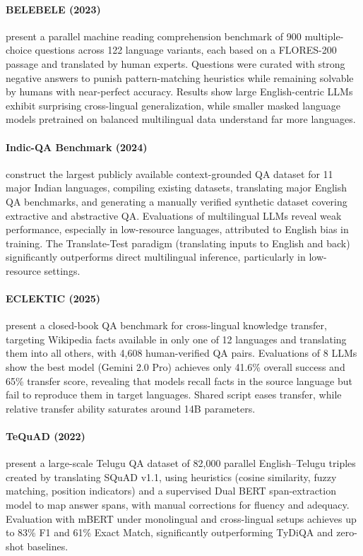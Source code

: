\documentclass[letterpaper]{article}
\begin{document}
\paragraph{BELEBELE (2023)} \citet{bandarkar2023belebele} present a parallel machine reading comprehension benchmark of 900 multiple-choice questions across 122 language variants, each based on a FLORES-200 passage and translated by human experts. Questions were curated with strong negative answers to punish pattern-matching heuristics while remaining solvable by humans with near-perfect accuracy. Results show large English-centric LLMs exhibit surprising cross-lingual generalization, while smaller masked language models pretrained on balanced multilingual data understand far more languages.

\paragraph{Indic-QA Benchmark (2024)} \citet{singh2024indic} construct the largest publicly available context-grounded QA dataset for 11 major Indian languages, compiling existing datasets, translating major English QA benchmarks, and generating a manually verified synthetic dataset covering extractive and abstractive QA. Evaluations of multilingual LLMs reveal weak performance, especially in low-resource languages, attributed to English bias in training. The Translate-Test paradigm (translating inputs to English and back) significantly outperforms direct multilingual inference, particularly in low-resource settings.

\paragraph{ECLEKTIC (2025)} \citet{goldman2025eclekticnovelchallengeset} present a closed-book QA benchmark for cross-lingual knowledge transfer, targeting Wikipedia facts available in only one of 12 languages and translating them into all others, with 4,608 human-verified QA pairs. Evaluations of 8 LLMs show the best model (Gemini 2.0 Pro) achieves only 41.6\% overall success and 65\% transfer score, revealing that models recall facts in the source language but fail to reproduce them in target languages. Shared script eases transfer, while relative transfer ability saturates around 14B parameters.

\paragraph{TeQuAD (2022)} \citet{vemula-etal-2022-tequad} present a large-scale Telugu QA dataset of 82,000 parallel English--Telugu triples created by translating SQuAD v1.1, using heuristics (cosine similarity, fuzzy matching, position indicators) and a supervised Dual BERT span-extraction model to map answer spans, with manual corrections for fluency and adequacy. Evaluation with mBERT under monolingual and cross-lingual setups achieves up to 83\% F1 and 61\% Exact Match, significantly outperforming TyDiQA and zero-shot baselines.
\end{document}
